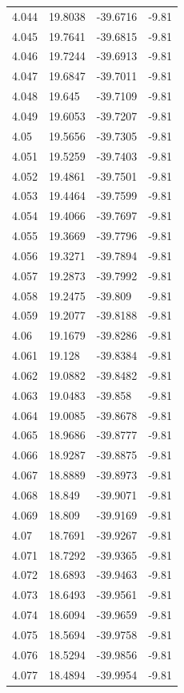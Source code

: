 \begin{tabular}{llll}
4.044 & 19.8038 & -39.6716 & -9.81 \\
4.045 & 19.7641 & -39.6815 & -9.81 \\
4.046 & 19.7244 & -39.6913 & -9.81 \\
4.047 & 19.6847 & -39.7011 & -9.81 \\
4.048 & 19.645 & -39.7109 & -9.81 \\
4.049 & 19.6053 & -39.7207 & -9.81 \\
4.05 & 19.5656 & -39.7305 & -9.81 \\
4.051 & 19.5259 & -39.7403 & -9.81 \\
4.052 & 19.4861 & -39.7501 & -9.81 \\
4.053 & 19.4464 & -39.7599 & -9.81 \\
4.054 & 19.4066 & -39.7697 & -9.81 \\
4.055 & 19.3669 & -39.7796 & -9.81 \\
4.056 & 19.3271 & -39.7894 & -9.81 \\
4.057 & 19.2873 & -39.7992 & -9.81 \\
4.058 & 19.2475 & -39.809 & -9.81 \\
4.059 & 19.2077 & -39.8188 & -9.81 \\
4.06 & 19.1679 & -39.8286 & -9.81 \\
4.061 & 19.128 & -39.8384 & -9.81 \\
4.062 & 19.0882 & -39.8482 & -9.81 \\
4.063 & 19.0483 & -39.858 & -9.81 \\
4.064 & 19.0085 & -39.8678 & -9.81 \\
4.065 & 18.9686 & -39.8777 & -9.81 \\
4.066 & 18.9287 & -39.8875 & -9.81 \\
4.067 & 18.8889 & -39.8973 & -9.81 \\
4.068 & 18.849 & -39.9071 & -9.81 \\
4.069 & 18.809 & -39.9169 & -9.81 \\
4.07 & 18.7691 & -39.9267 & -9.81 \\
4.071 & 18.7292 & -39.9365 & -9.81 \\
4.072 & 18.6893 & -39.9463 & -9.81 \\
4.073 & 18.6493 & -39.9561 & -9.81 \\
4.074 & 18.6094 & -39.9659 & -9.81 \\
4.075 & 18.5694 & -39.9758 & -9.81 \\
4.076 & 18.5294 & -39.9856 & -9.81 \\
4.077 & 18.4894 & -39.9954 & -9.81 \\

\end{tabular}
